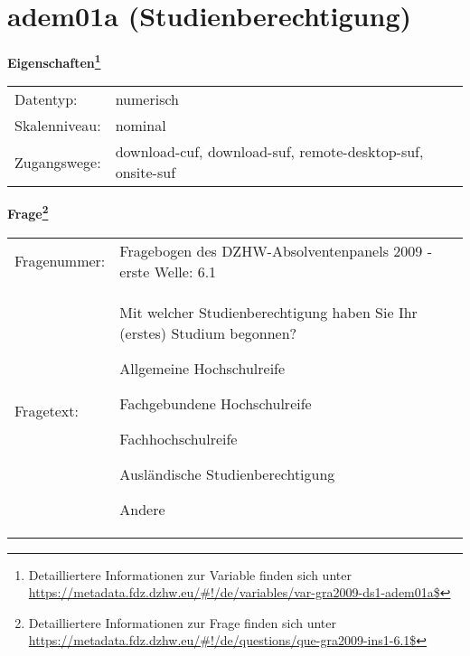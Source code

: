
    \setcounter{footnote}{0}

    \vspace*{-1.8cm}
	\section{adem01a (Studienberechtigung)}
	\label{section:adem01a}



    \vspace*{0.5cm}
    \noindent\textbf{Eigenschaften\footnote{Detailliertere Informationen zur Variable finden sich unter
		\url{https://metadata.fdz.dzhw.eu/\#!/de/variables/var-gra2009-ds1-adem01a$}}}\\
	\begin{tabularx}{\hsize}{@{}lX}
	Datentyp: & numerisch \\
	Skalenniveau: & nominal \\
	Zugangswege: &
	  download-cuf, 
	  download-suf, 
	  remote-desktop-suf, 
	  onsite-suf
 \\
    \end{tabularx}



				\vspace*{0.5cm}
                \noindent\textbf{Frage\footnote{Detailliertere Informationen zur Frage finden sich unter
		              \url{https://metadata.fdz.dzhw.eu/\#!/de/questions/que-gra2009-ins1-6.1$}}}\\
				\begin{tabularx}{\hsize}{@{}lX}
					Fragenummer: &
					  Fragebogen des DZHW-Absolventenpanels 2009 - erste Welle:
					  6.1
 \\
					Fragetext: & Mit welcher Studienberechtigung haben Sie Ihr (erstes) Studium begonnen?\par  Allgemeine Hochschulreife\par  Fachgebundene Hochschulreife\par  Fachhochschulreife\par  Ausländische Studienberechtigung\par  Andere \\
				\end{tabularx}





